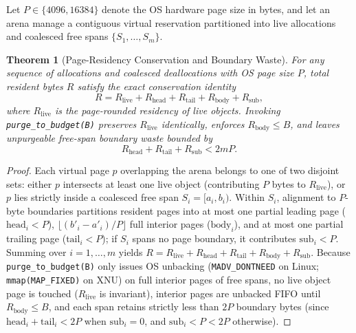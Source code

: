 \documentclass[sigconf,screen]{acmart}
\newtheorem{theorem}{Theorem}
\begin{document}
Let $P \in \{4096, 16384\}$ denote the OS hardware page size in bytes, and let an arena manage a contiguous virtual reservation partitioned into live allocations and coalesced free spans $\{S_1, \dots, S_m\}$.

\begin{theorem}[Page-Residency Conservation and Boundary Waste]
\label{thm:conservation}
For any sequence of allocations and coalesced deallocations with OS page size $P$, total resident bytes $R$ satisfy the exact conservation identity
\begin{equation}
  R = R_{\text{live}} + R_{\text{head}} + R_{\text{tail}} + R_{\text{body}} + R_{\text{sub}},
\end{equation}
where $R_{\text{live}}$ is the page-rounded residency of live objects. Invoking \texttt{purge\_to\_budget(B)} preserves $R_{\text{live}}$ identically, enforces $R_{\text{body}} \le B$, and leaves unpurgeable free-span boundary waste bounded by
\begin{equation}
  R_{\text{head}} + R_{\text{tail}} + R_{\text{sub}} < 2mP.
\end{equation}
\end{theorem}

\begin{proof}
Each virtual page $p$ overlapping the arena belongs to one of two disjoint sets: either $p$ intersects at least one live object (contributing $P$ bytes to $R_{\text{live}}$), or $p$ lies strictly inside a coalesced free span $S_i = [a_i, b_i)$. Within $S_i$, alignment to $P$-byte boundaries partitions resident pages into at most one partial leading page ($\text{head}_i < P$), $\lfloor (b'_i - a'_i)/P \rfloor$ full interior pages ($\text{body}_i$), and at most one partial trailing page ($\text{tail}_i < P$); if $S_i$ spans no page boundary, it contributes $\text{sub}_i < P$. Summing over $i=1,\dots,m$ yields $R = R_{\text{live}} + R_{\text{head}} + R_{\text{tail}} + R_{\text{body}} + R_{\text{sub}}$. Because \texttt{purge\_to\_budget(B)} only issues OS unbacking (\texttt{MADV\_DONTNEED} on Linux; \texttt{mmap(MAP\_FIXED)} on XNU) on full interior pages of free spans, no live object page is touched ($R_{\text{live}}$ is invariant), interior pages are unbacked FIFO until $R_{\text{body}} \le B$, and each span retains strictly less than $2P$ boundary bytes (since $\text{head}_i + \text{tail}_i < 2P$ when $\text{sub}_i=0$, and $\text{sub}_i < P < 2P$ otherwise).
\end{proof}
\end{document}
